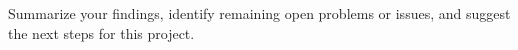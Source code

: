 Summarize your findings, identify
remaining open problems or
issues, and suggest the next steps for this project. 

\blindtext
